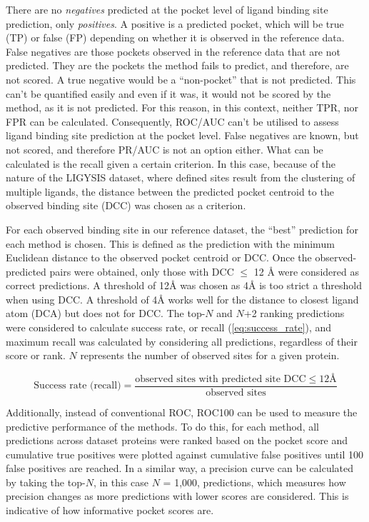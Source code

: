 There are no \textit{negatives} predicted at the pocket level of ligand binding site prediction, only \textit{positives}. A positive is a predicted pocket, which will be true (TP) or false (FP) depending on whether it is observed in the reference data. False negatives are those pockets observed in the reference data that are not predicted. They are the pockets the method fails to predict, and therefore, are not scored. A true negative would be a ``non-pocket'' that is not predicted. This can't be quantified easily and even if it was, it would not be scored by the method, as it is not predicted. For this reason, in this context, neither TPR, nor FPR can be calculated. Consequently, ROC/AUC can't be utilised to assess ligand binding site prediction at the pocket level. False negatives are known, but not scored, and therefore PR/AUC is not an option either. What can be calculated is the recall given a certain criterion. In this case, because of the nature of the LIGYSIS dataset, where defined sites result from the clustering of multiple ligands, the distance between the predicted pocket centroid to the observed binding site (DCC) was chosen as a criterion.

For each observed binding site in our reference dataset, the ``best'' prediction for each method is chosen. This is defined as the prediction with the minimum Euclidean distance to the observed pocket centroid or DCC. Once the observed-predicted pairs were obtained, only those with DCC $\leq$ 12 \AA{} were considered as correct predictions. A threshold of 12\AA{} was chosen as 4\AA{} is too strict a threshold when using DCC. A threshold of 4\AA{} works well for the distance to closest ligand atom (DCA) but does not for DCC. The top-$N$ and $N$+2 ranking predictions were considered to calculate success rate, or recall (\autoref{eq:success_rate}), and maximum recall was calculated by considering all predictions, regardless of their score or rank. $N$ represents the number of observed sites for a given protein.

\begin{equation}
\text{Success rate (recall)} = \frac{\text{observed sites with predicted site DCC} \leq 12 \text{Å}}{\text{observed sites}}
\label{eq:success_rate}
\end{equation}

Additionally, instead of conventional ROC, ROC100 \cite{WEBBER_2003_ROC100, SCOTT_2007_ROC100} can be used to measure the predictive performance of the methods. To do this, for each method, all predictions across dataset proteins were ranked based on the pocket score and cumulative true positives were plotted against cumulative false positives until 100 false positives are reached. In a similar way, a precision curve can be calculated by taking the top-$N$, in this case $N$ = 1,000, predictions, which measures how precision changes as more predictions with lower scores are considered. This is indicative of how informative pocket scores are.

